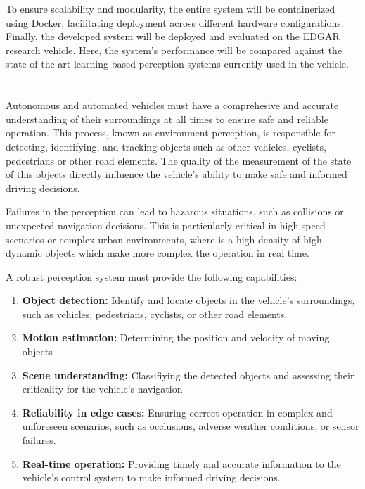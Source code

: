 To ensure scalability and modularity, the entire system will be containerized using Docker, facilitating deployment across different
hardware configurations. Finally, the developed system will be deployed and evaluated on the EDGAR research vehicle. Here, 
the system's performance will be compared against the state-of-the-art learning-based perception systems currently used in the vehicle.


\section{}

Autonomous and automated vehicles must have a comprehesive and accurate understanding of their surroundings at 
all times to ensure safe and reliable operation. This process, known as environment perception, is responsible
for detecting, identifying, and tracking objects such as other vehicles, cyclists, pedestrians or other
road elements. The quality of the measurement of the state of this objects directly influence the vehicle's
ability to make safe and informed driving decisions. 

Failures in the perception can lead to hazarous situations, such as collisions or unexpected navigation decisions.
This is particularly critical in high-speed scenarios or complex urban environments, where is a high density of
high dynamic objects which make more complex the operation in real time. 

A robust perception system must provide the following capabilities:

\begin{enumerate}
  \item \textbf{Object detection:} Identify and locate objects in the vehicle's surroundings, such as vehicles, pedestrians, cyclists, or other road elements.
  \item \textbf{Motion estimation:} Determining the position and velocity of moving objects
  \item \textbf{Scene understanding:} Classifiying the detected objects and assessing their criticality for the vehicle's navigation
  \item \textbf{Reliability in edge cases:} Ensuring correct operation in complex and unforeseen scenarios, such as occlusions, adverse weather conditions, or sensor failures.
  \item \textbf{Real-time operation:} Providing timely and accurate information to the vehicle's control system to make informed driving decisions.
\end{enumerate}

